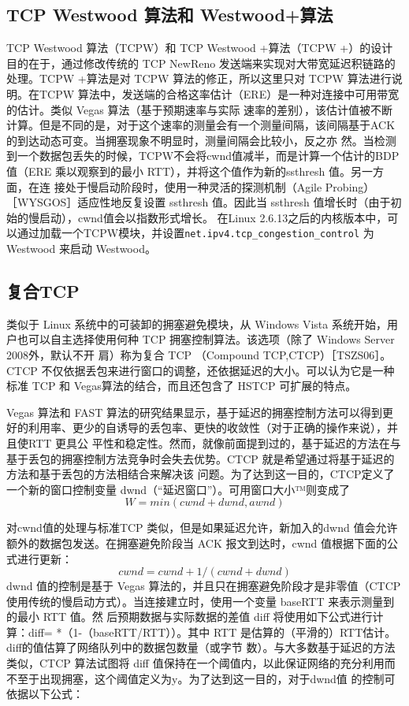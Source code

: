 \subsection{TCP Westwood 算法和 Westwood+算法}
TCP Westwood 算法（TCPW）和 TCP Westwood +算法（TCPW +）的设计目的在于，通过修改传统的 TCP NewReno 发送端来实现对大带宽延迟积链路的处理。TCPW +算法是对
TCPW 算法的修正，所以这里只对 TCPW 算法进行说明。在TCPW 算法中，发送端的合格这率估计（ERE）是一种对连接中可用带宽的估计。类似 Vegas 算法（基于预期速率与实际
速率的差别），该估计值被不断计算。但是不同的是，对于这个速率的测量会有一个测量间隔，该间隔基于ACK 的到达动态可变。当拥塞现象不明显时，测量间隔会比较小，反之亦
然。当检测到一个数据包丢失的时候，TCPW不会将cwnd值减半，而是计算一个估计的BDP 值（ERE 乘以观察到的最小 RTT），并将这个值作为新的ssthresh 值。另一方面，在连
接处于慢启动阶段时，使用一种灵活的探测机制（Agile Probing）［WYSGOS］适应性地反复设置 ssthresh 值。因此当 ssthresh 值增长时（由于初始的慢启动），cwnd值会以指数形式增长。
在Linux 2.6.13之后的内核版本中，可以通过加载一个TCPW模块，并设置\verb|net.ipv4.tcp_congestion_control| 为 Westwood 来启动 Westwood。

\subsection{复合TCP}
类似于 Linux 系统中的可装卸的拥塞避免模块，从 Windows Vista 系统开始，用户也可以自主选择使用何种 TCP 拥塞控制算法。该选项（除了 Windows Server 2008外，默认不开
肩）称为复合 TCP （Compound TCP,CTCP）［TSZS06］。CTCP 不仅依据丢包来进行窗口的调整，还依据延迟的大小。可以认为它是一种标准 TCP 和 Vegas算法的结合，而且还包含了
HSTCP 可扩展的特点。

Vegas 算法和 FAST 算法的研究结果显示，基于延迟的拥塞控制方法可以得到更好的利用率、更少的自诱导的丢包率、更快的收敛性（对于正确的操作来说），并且使RTT 更具公
平性和稳定性。然而，就像前面提到过的，基于延迟的方法在与基于丢包的拥塞控制方法竞争时会失去优势。CTCP 就是希望通过将基于延迟的方法和基于丢包的方法相结合来解决该
问题。为了达到这一目的，CTCP定义了一个新的窗口控制变量 dwnd（“延迟窗口”）。可用窗口大小™则变成了
\begin{equation}
    W = min (cwnd + dwnd, awnd)
\end{equation}

对cwnd值的处理与标准TCP 类似，但是如果延迟允许，新加入的dwnd 值会允许额外的数据包发送。在拥塞避免阶段当 ACK 报文到达时，cwnd 值根据下面的公式进行更新：
\begin{equation}
    cwnd = cwnd + 1 / (cwnd + dwnd)
\end{equation}
dwnd 值的控制是基于 Vegas 算法的，并且只在拥塞避免阶段才是非零值（CTCP 使用传统的慢启动方式）。当连接建立时，使用一个变量 baseRTT 来表示测量到的最小 RTT 值。然
后预期数据与实际数据的差值 diff 将使用如下公式进行计算：diff= *（1-（baseRTT/RTT））。其中 RTT 是估算的（平滑的）RTT估计。diff的值估算了网络队列中的数据包数量（或字节
数）。与大多数基于延迟的方法类似，CTCP 算法试图将 diff 值保持在一个阈值内，以此保证网络的充分利用而不至于出现拥塞，这个阈值定义为y。为了达到这一目的，对于dwnd值
的控制可依据以下公式：

